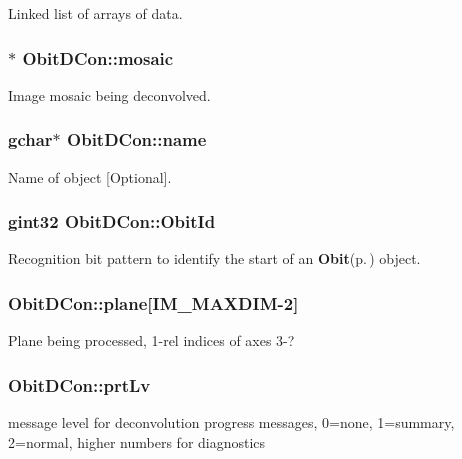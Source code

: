 Linked list of arrays of data. 

\subsubsection{$\ast$ {\bf Obit\-DCon::mosaic}}\label{structObitDCon_o6}


Image mosaic being deconvolved. 

\subsubsection{\setlength{\rightskip}{0pt plus 5cm}gchar$\ast$ {\bf Obit\-DCon::name}}\label{structObitDCon_o3}


Name of object [Optional]. 

\subsubsection{\setlength{\rightskip}{0pt plus 5cm}gint32 {\bf Obit\-DCon::Obit\-Id}}\label{structObitDCon_o0}


Recognition bit pattern to identify the start of an {\bf Obit}{\rm (p.\,\pageref{structObit})} object. 

\subsubsection{ {\bf Obit\-DCon::plane}[IM\_\-MAXDIM-2]}\label{structObitDCon_o7}


Plane being processed, 1-rel indices of axes 3-? 

\subsubsection{ {\bf Obit\-DCon::prt\-Lv}}\label{structObitDCon_o8}


message level for deconvolution progress messages, 0=none, 1=summary, 2=normal, higher numbers for diagnostics 

